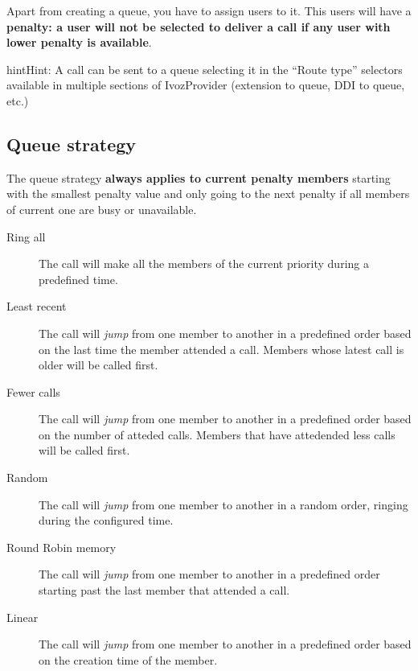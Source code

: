 \documentclass[letterpaper,10pt,english]{sphinxmanual}
\begin{document}
Apart from creating a queue, you have to assign users to it. This users will have
a \textbf{penalty: a user will not be selected to deliver a call if any user with lower
penalty is available}.

\begin{notice}{hint}{Hint:}
A call can be sent to a queue selecting it in the ``Route type'' selectors
available in multiple sections of IvozProvider (extension to queue, DDI
to queue, etc.)
\end{notice}


\subsection{Queue strategy}
\label{pbx_features/queues:queue-strategy}
The queue strategy \textbf{always applies to current penalty members} starting with
the smallest penalty value and only going to the next penalty if all members of
current one are busy or unavailable.
\begin{description}
\item[{Ring all}] \leavevmode{}\label{pbx_features/queues:term-ring-all}
The call will make all the members of the current priority during a
predefined time.

\item[{Least recent}] \leavevmode{}\label{pbx_features/queues:term-least-recent}
The call will \emph{jump} from one member to another in a predefined order
based on the last time the member attended a call. Members whose latest
call is older will be called first.

\item[{Fewer calls}] \leavevmode{}\label{pbx_features/queues:term-fewer-calls}
The call will \emph{jump} from one member to another in a predefined order
based on the number of atteded calls. Members that have attedended less
calls will be called first.

\item[{Random}] \leavevmode{}\label{pbx_features/queues:term-random}
The call will \emph{jump} from one member to another in a random order,
ringing during the configured time.

\item[{Round Robin memory}] \leavevmode{}\label{pbx_features/queues:term-round-robin-memory}
The call will \emph{jump} from one member to another in a predefined order
starting past the last member that attended a call.

\item[{Linear}] \leavevmode{}\label{pbx_features/queues:term-linear}
The call will \emph{jump} from one member to another in a predefined order
based on the creation time of the member.

\end{description}
\end{document}
